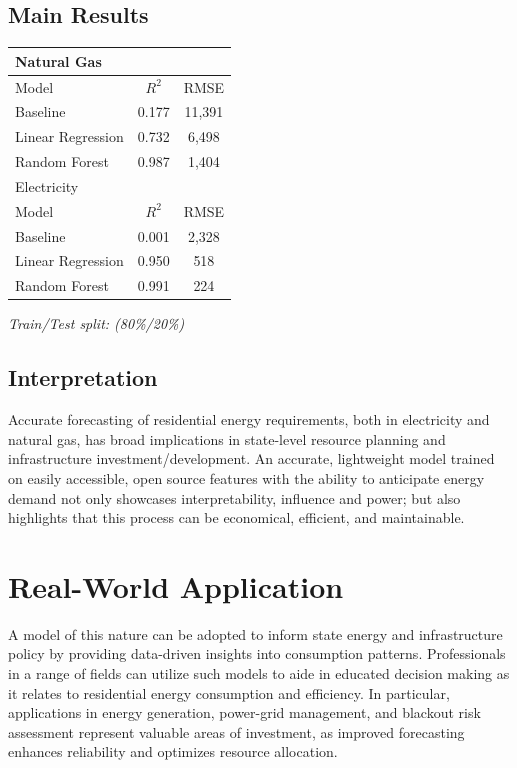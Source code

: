 \documentclass[11pt,a4paper]{article}
\begin{document}
\subsection{Main Results}
\begin{center}
\begin{tabular}{lcc}
\toprule\toprule
Natural Gas\\
\toprule
Model & $R^2$ & RMSE \\
\midrule
Baseline & 0.177 & 11,391 \\
Linear Regression & 0.732 & 6,498\\
Random Forest & 0.987 & 1,404 \\
\toprule \toprule
Electricity\\
\toprule
Model & $R^2$ & RMSE \\
\midrule
Baseline & 0.001 & 2,328 \\
Linear Regression & 0.950 & 518 \\
Random Forest & 0.991 & 224 \\
\bottomrule\bottomrule
\end{tabular}
\end{center}

\textit{Train/Test split: (80\%/20\%)} 

\subsection{Interpretation}

Accurate forecasting of residential energy requirements, both in electricity and natural gas, has broad implications in state-level resource planning and infrastructure investment/development. An accurate, lightweight model trained on easily accessible, open source features with the ability to anticipate energy demand not only showcases interpretability, influence and power; but also highlights that this process can be economical, efficient, and maintainable.  

\section{Real-World Application}
A model of this nature can be adopted to inform state energy and infrastructure policy by providing data-driven insights into consumption patterns. Professionals in a range of fields can utilize such models to aide in educated decision making as it relates to residential energy consumption and efficiency. In particular, applications in energy generation, power-grid management, and blackout risk assessment represent valuable areas of investment, as improved forecasting enhances reliability and optimizes resource allocation.
\end{document}
